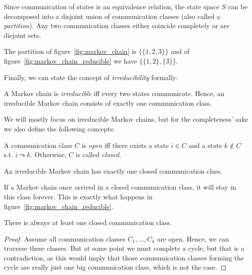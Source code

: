\documentclass[../../main.tex]{subfiles}
\begin{document}
\begin{remark}
    Since communication of states is an equivalence relation, the state space $S$ can be decomposed into a disjoint union of communication classes (also called a \emph{partition}). Any two communication classes either coincide completely or are disjoint sets.
\end{remark}

\begin{example}
    The partition of figure~\ref{fig:markov_chain} is $\{ \{ 1, 2, 3 \} \}$ and of figure~\ref{fig:markov_chain_reducible} we have $\{ \{ 1, 2 \} , \{ 3 \} \}$.
\end{example}

Finally, we can state the concept of \emph{irreducibility} formally:

\begin{definition}[Irreducibility]
    A Markov chain is \emph{irreducible} iff every two states communicate. Hence, an irreducible Markov chain consists of exactly one communication class.
\end{definition}

We will mostly focus on irreducible Markov chains, but for the completeness' sake we also define the following concepts:

\begin{definition}
    A communication class $C$ is \emph{open} iff there exists a state $i \in C$ and a state $k \not \in C$ s.t. $i \leadsto k$. Otherwise, $C$ is called \emph{closed}.
\end{definition}

\begin{remark}
    An irreducible Markov chain has exactly one closed communication class.
\end{remark}

If a Markov chain once arrived in a closed communication class, it will stay in this class forever. This is exactly what happens in figure~\ref{fig:markov_chain_reducible}.

\begin{theorem}
    There is always at least one closed communication class.
\end{theorem}
\vspace{-2.5em}
\begin{proof}
Assume all communication classes $C_1, \dots, C_k$ are open. Hence, we can traverse these classes. But at some point we must complete a cycle, but that is a contradiction, as this would imply that those communication classes forming the cycle are really just one big communication class, which is not the case.
\end{proof}
\end{document}
